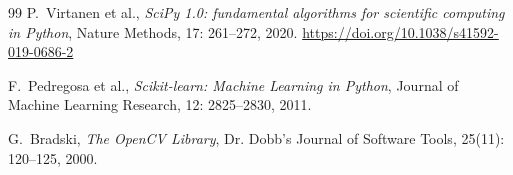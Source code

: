 \begin{thebibliography}{99}
P.\ Virtanen et al.,
\textit{SciPy 1.0: fundamental algorithms for scientific computing in Python},
Nature Methods, 17: 261--272, 2020.
\url{https://doi.org/10.1038/s41592-019-0686-2}

F.\ Pedregosa et al.,
\textit{Scikit-learn: Machine Learning in Python},
Journal of Machine Learning Research, 12: 2825--2830, 2011.

G.\ Bradski,
\textit{The OpenCV Library},
Dr. Dobb's Journal of Software Tools, 25(11): 120--125, 2000.

\end{thebibliography}
